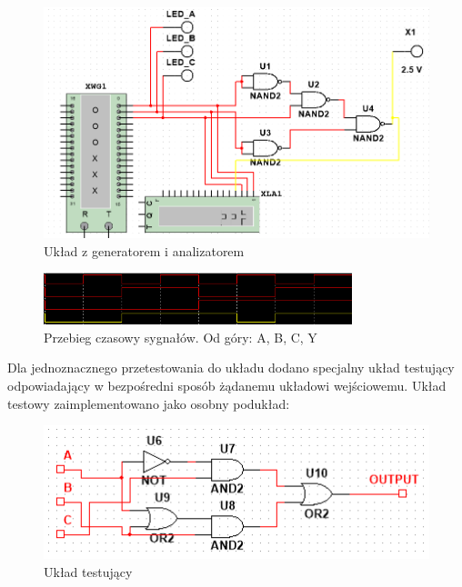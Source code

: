 \documentclass[12pt,a4paper,openright]{mwrep}
\begin{document}
\begin{figure}[H]
    \centering
    \includegraphics[width=1\textwidth]{images/1a_circuit_word_generator.png}
    \caption{Układ z generatorem i analizatorem}
    \label{rys:1a_circuit_with_generators}
\end{figure}

\begin{figure}[H]
    \centering
    \includegraphics[width=0.8\textwidth]{images/1a_timeseries.png}
    \caption{Przebieg czasowy sygnałów. Od góry: A, B, C, Y}
    \label{rys:1a_timeseries}
\end{figure}

Dla jednoznacznego przetestowania do układu dodano specjalny układ
testujący odpowiadający w bezpośredni sposób żądanemu układowi wejściowemu.
Układ testowy zaimplementowano jako osobny podukład:

\begin{figure}[H]
    \centering
    \includegraphics[width=1\textwidth]{images/1a_test.png}
    \caption{Układ testujący}
    \label{rys:1a_test}
\end{figure}
\end{document}
